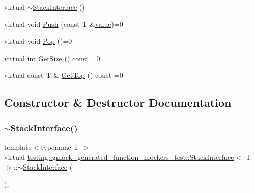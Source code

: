 \begin{DoxyCompactItemize}
\item 
virtual \mbox{\hyperlink{classtesting_1_1gmock__generated__function__mockers__test_1_1_stack_interface_a87b83db3e9cb1c986d6b0649b37cfa7c}{$\sim$\+Stack\+Interface}} ()
\item 
virtual void \mbox{\hyperlink{classtesting_1_1gmock__generated__function__mockers__test_1_1_stack_interface_a49448f6195021fee947d37b80b6e5d30}{Push}} (const T \&\mbox{\hyperlink{_obj__test_2lib_2googletest-master_2googlemock_2test_2gmock-matchers__test_8cc_a337b8a670efc0b086ad3af163f3121b6}{value}})=0
\item 
virtual void \mbox{\hyperlink{classtesting_1_1gmock__generated__function__mockers__test_1_1_stack_interface_a1a6646d1d9febe90c607b9b3e4539b67}{Pop}} ()=0
\item 
virtual int \mbox{\hyperlink{classtesting_1_1gmock__generated__function__mockers__test_1_1_stack_interface_a537ec8647a2333f50e5f923a85b90eba}{Get\+Size}} () const =0
\item 
virtual const T \& \mbox{\hyperlink{classtesting_1_1gmock__generated__function__mockers__test_1_1_stack_interface_af36e32b9ae568100363466d1ebf95364}{Get\+Top}} () const =0
\end{DoxyCompactItemize}


\subsection{Constructor \& Destructor Documentation}
\mbox{\label{classtesting_1_1gmock__generated__function__mockers__test_1_1_stack_interface_a87b83db3e9cb1c986d6b0649b37cfa7c}} 
\subsubsection{\texorpdfstring{$\sim$StackInterface()}{~StackInterface()}\hspace{0.1cm}{\footnotesize\ttfamily [1/3]}}
{\footnotesize\ttfamily template$<$typename T $>$ \\
virtual \mbox{\hyperlink{classtesting_1_1gmock__generated__function__mockers__test_1_1_stack_interface}{testing\+::gmock\+\_\+generated\+\_\+function\+\_\+mockers\+\_\+test\+::\+Stack\+Interface}}$<$ T $>$\+::$\sim$\mbox{\hyperlink{classtesting_1_1gmock__generated__function__mockers__test_1_1_stack_interface}{Stack\+Interface}} (\begin{DoxyParamCaption}{ }\end{DoxyParamCaption})\hspace{0.3cm}{\ttfamily [inline]}, {\ttfamily [virtual]}}

